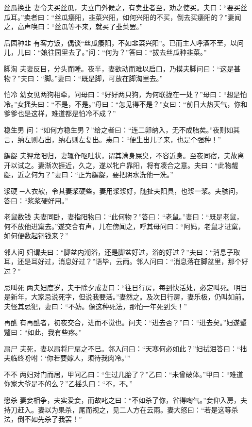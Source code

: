 \documentclass[12pt,UTF8]{ctexbook}
\begin{document}
丝瓜换韭
妻令夫买丝瓜，夫立门外候之，有卖韭者至，劝之使买。夫曰：“要买丝瓜耳。”卖者曰：“丝瓜痿阳，韭菜兴阳，如何兴阳的不买，倒去买痿阳的？”妻闻之，高声唤曰：“丝瓜等不来，就买了韭菜罢。”

后园种韭
有客方饭，偶谈“丝瓜痿阳，不如韭菜兴阳”。已而主人呼酒不至，以问儿，儿曰：“娘往园里去了。”问：“何为？”答曰：“拔去丝瓜种韭菜。”

脚淘
夫妻反目，分头而睡。夜半，妻欲动而难以启口，乃摸夫脚问曰：“这是甚物？”夫曰：“脚。”妻曰：“既是脚，可放在脚淘里去。”

怕冷
幼女见两狗相牵，问母曰：“好好两只狗，为何联拢在一处？”母曰：“想是怕冷。”女摇头曰：“不是，不是。”母曰：“怎见得不是？”女曰：“前日大热天气，你和爹爹也是这样，难道都是怕冷不成？”

稳生男
问：“如何方稳生男？”给之者曰：“连二卵纳入，无不成胎矣。”夜则如其言，纳左则右出，纳右则左复出。恚曰：“便生出儿子来，也是个强种！”

龌龊
夫狎龙阳归，妻辄作呕吐状，谓其满身屎臭，不容近身。至夜同宿，夫故离开以试之。妻渐次捱近，久之，遂以牝户靠阳，将有凑合之意。夫曰：“此物龌龊，近之何为？”妻曰：“正为龌龊，要把阴水洗他一洗。”

浆硬
─人衣软，令其妻浆硬些。妻用浆浆好，随扯夫阳具，也浆一浆。夫骇问，答曰：“浆浆硬好用。”

老鼠数钱
夫妻同卧，妻指阳物曰：“此何物？”答曰：“老鼠。”妻曰：“既是老鼠，何不放他进窠去。”遂交合有声，儿在傍闻之，呼其母问曰：“阿妈，老鼠才进窠，如何便数起铜钱来？”

邻人问
妇谓夫曰：“脚盆内潮浴，还是脚盆好过，浴的好过？”夫曰：“消息子取耳，还是耳好过，消息好过？”语毕，云雨。邻人问曰：“消息落在脚盆里，那个好过？”

忌叫死
两夫妇度岁，夫于除夕戒妻曰：“往日行房，每到快活处，必定叫死。明日是新年，大家忌说死字，但说我要活。”妻然之。及次日行房，妻乐极，仍叫如前。夫怪其忌犯，妻曰：“不妨。像这种死法，那怕一年死到头！”

再醮
有再醮者，初夜交合，进而不觉也。问夫：“进去否？”曰：“进去矣。”妇遂颦蹩曰：“如此，我有些疼。”

扇尸
夫死，妻以扇将尸扇之不已。邻入问曰：“天寒何必如此？”妇拭泪答曰：“拙夫临终吩咐：‘你若要嫁人，须待我肉冷。’”

不不
两妇对门而居，甲问乙曰：“生过几胎了？”乙曰：“未曾破体。”甲曰：“难道你家大爷是不的么？”乙摇头曰：“不，不。”

愿杀
妻妾相争，夫实爱妾，而故叱之曰：“不如杀了你，省得啕气。”妾仰入房，夫持刀赶入。妻以为果杀，尾而视之，见二人方在云雨。妻大怒曰：“若是这等杀法，倒不如先杀了我罢！”
\end{document}
